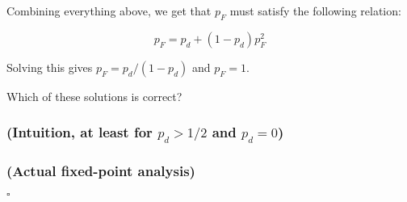 
Combining everything above, we get that $p_F$ must satisfy the following relation:

\begin{equation}
p_F = p_d + (1-p_d)p_F^2
\end{equation}


Solving this gives $p_F = p_d / (1 - p_d)$ and $p_F = 1$. 

Which of these solutions is correct? 





\subsubsection{(Intuition, at least for $p_d > 1/2$ and $p_d = 0$)}

\subsubsection{(Actual fixed-point analysis)}



$\square$



